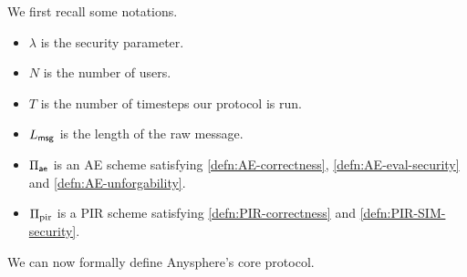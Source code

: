 We first recall some notations.
\begin{itemize}
    \item $\lambda$ is the security parameter.
    \item $N$ is the number of users.
    \item $T$ is the number of timesteps our protocol is run.
    \item $L_{\mathsf{msg}}$ is the length of the raw message.
    \item $\Pi_{\mathsf{ae}}$ is an AE scheme satisfying \cref{defn:AE-correctness}, \cref{defn:AE-eval-security} and \cref{defn:AE-unforgability}.
    \item $\Pi_{\text{pir}}$ is a PIR scheme satisfying \cref{defn:PIR-correctness} and \cref{defn:PIR-SIM-security}.
\end{itemize}
We can now formally define Anysphere's core protocol.
